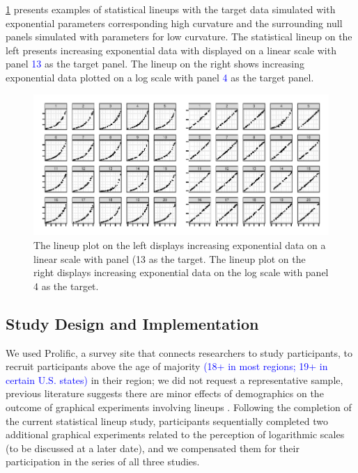 \documentclass[12pt]{article}
\begin{document}
\cref{fig:lineup-example} presents examples of statistical lineups with
the target data simulated with exponential parameters corresponding high
curvature and the surrounding null panels simulated with parameters for
low curvature. The statistical lineup on the left presents increasing
exponential data with displayed on a linear scale with panel
{\textcolor{blue}{13}} as the target panel. The lineup on the right
shows increasing exponential data plotted on a log scale with panel
{\textcolor{blue}{4}} as the target panel.

\begin{figure}[tbp]

{\centering \includegraphics[width=\linewidth,]{logarithmic-lineups-revisions_files/figure-latex/lineup-example-1} 

}

\caption[Lineup examples]{The lineup plot on the left displays increasing exponential data on a linear scale with panel (13 as the target. The lineup plot on the right displays increasing exponential data on the log scale with panel 4 as the target.}\label{fig:lineup-example}
\end{figure}

\hypertarget{study-design-and-implementation}{%
\subsection{Study Design and
Implementation}\label{study-design-and-implementation}}

We used Prolific, a survey site that connects researchers to study
participants, to recruit participants above the age of majority
{\textcolor{blue}{(18+ in most regions; 19+ in certain U.S. states)}} in
their region; we did not request a representative sample, previous
literature suggests there are minor effects of demographics on the
outcome of graphical experiments involving lineups
\citep{vanderplas2015spatial, majumder_validation_2013}. Following the
completion of the current statistical lineup study, participants
sequentially completed two additional graphical experiments related to
the perception of logarithmic scales (to be discussed at a later date),
and we compensated them for their participation in the series of all
three studies.
\end{document}
